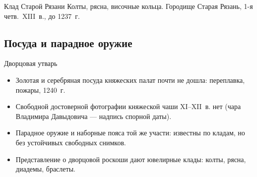 \begin{frame}{Клад Старой Рязани}
    {Колты, рясна, височные кольца.
     Городище Старая Рязань, 1-я четв.\ XIII~в., до 1237~г.}
\end{frame}

\subsection{Посуда и парадное оружие}

\begin{frame}{Дворцовая утварь}
  \begin{itemize}
    \item Золотая и серебряная посуда княжеских палат
          почти не дошла: переплавка, пожары, 1240~г.
    \item Свободной достоверной фотографии княжеской чаши XI--XII~в.
          нет (чара Владимира Давыдовича --- надпись спорной даты).
    \item Парадное оружие и наборные пояса той же участи:
          известны по кладам, но без устойчивых свободных снимков.
    \item Представление о дворцовой роскоши дают ювелирные клады:
          колты, рясна, диадемы, браслеты.
  \end{itemize}
\end{frame}